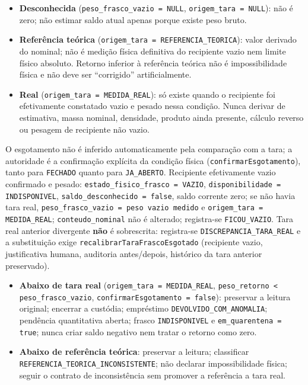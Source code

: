 \begin{regra}
\begin{itemize}
    \item \textbf{Desconhecida} (\texttt{peso\_frasco\_vazio = NULL}, \texttt{origem\_tara = NULL}): não é zero; não estimar saldo atual apenas porque existe peso bruto.
    \item \textbf{Referência teórica} (\texttt{origem\_tara = REFERENCIA\_TEORICA}): valor derivado do nominal; não é medição física definitiva do recipiente vazio nem limite físico absoluto. Retorno inferior à referência teórica não é impossibilidade física e não deve ser ``corrigido'' artificialmente.
    \item \textbf{Real} (\texttt{origem\_tara = MEDIDA\_REAL}): só existe quando o recipiente foi efetivamente constatado vazio e pesado nessa condição. Nunca derivar de estimativa, massa nominal, densidade, produto ainda presente, cálculo reverso ou pesagem de recipiente não vazio.
\end{itemize}
\end{regra}

\begin{regra}
O esgotamento não é inferido automaticamente pela comparação com a tara; a autoridade é a confirmação explícita da condição física (\texttt{confirmarEsgotamento}), tanto para \texttt{FECHADO} quanto para \texttt{JA\_ABERTO}. Recipiente efetivamente vazio confirmado e pesado: \texttt{estado\_fisico\_frasco = VAZIO}, \texttt{disponibilidade = INDISPONIVEL}, \texttt{saldo\_desconhecido = false}, saldo corrente zero; se não havia tara real, \texttt{peso\_frasco\_vazio = peso vazio medido} e \texttt{origem\_tara = MEDIDA\_REAL}; \texttt{conteudo\_nominal} não é alterado; registra-se \texttt{FICOU\_VAZIO}. Tara real anterior divergente \textbf{não} é sobrescrita: registra-se \texttt{DISCREPANCIA\_TARA\_REAL} e a substituição exige \texttt{recalibrarTaraFrascoEsgotado} (recipiente vazio, justificativa humana, auditoria antes/depois, histórico da tara anterior preservado).
\end{regra}

\begin{regra}
\begin{itemize}
    \item \textbf{Abaixo de tara real} (\texttt{origem\_tara = MEDIDA\_REAL}, \texttt{peso\_retorno < peso\_frasco\_vazio}, \texttt{confirmarEsgotamento = false}): preservar a leitura original; encerrar a custódia; empréstimo \texttt{DEVOLVIDO\_COM\_ANOMALIA}; pendência quantitativa aberta; frasco \texttt{INDISPONIVEL} e \texttt{em\_quarentena = true}; nunca criar saldo negativo nem tratar o retorno como zero.
    \item \textbf{Abaixo de referência teórica}: preservar a leitura; classificar \texttt{REFERENCIA\_TEORICA\_INCONSISTENTE}; não declarar impossibilidade física; seguir o contrato de inconsistência sem promover a referência a tara real.
\end{itemize}
\end{regra}

